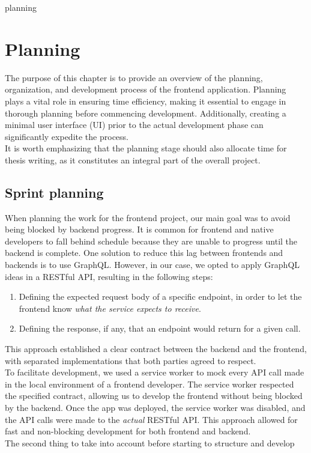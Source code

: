 planning\documentclass[../memory.tex]{subfiles}
\begin{document}
\chapter{Planning}
The purpose of this chapter is to provide an overview of the planning,
organization, and development process of the frontend application. Planning
plays a vital role in ensuring time efficiency, making it essential to engage in
thorough planning before commencing development. Additionally, creating a
minimal user interface (UI) prior to the actual development phase can
significantly expedite the process.
\\
It is worth emphasizing that the planning stage should also allocate time for
thesis writing, as it constitutes an integral part of the overall project.
\section{Sprint planning}
When planning the work for the frontend project, our main goal was to avoid
being blocked by backend progress. It is common for frontend and native
developers to fall behind schedule because they are unable to progress until the
backend is complete. One solution to reduce this lag between frontends and
backends is to use GraphQL. However, in our case, we opted to apply GraphQL
ideas in a RESTful API, resulting in the following steps:
\begin{enumerate}[label = -]
	\item Defining the expected request body of a specific endpoint, in order to
	      let the frontend know \emph{what the service expects to receive}.
	\item Defining the response, if any, that an endpoint would return for a given call.
\end{enumerate}
This approach established a clear contract between the backend and the frontend,
with separated implementations that both parties agreed to respect.
\\
To facilitate development, we used a service worker to mock every API call made
in the local environment of a frontend developer. The service worker respected
the specified contract, allowing us to develop the frontend without being
blocked by the backend. Once the app was deployed, the service worker was
disabled, and the API calls were made to the \emph{actual} RESTful API. This
approach allowed for fast and non-blocking development for both frontend and
backend.
\\[8pt]
The second thing to take into account before starting to structure and develop
\end{document}
